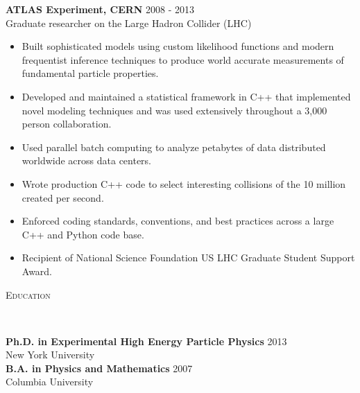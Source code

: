 \documentclass[9pt]{article}
\newenvironment{changemargin}[2]{%
  \begin{list}{}{%
    \setlength{\topsep}{0pt}%
    \setlength{\leftmargin}{#1}%
    \setlength{\rightmargin}{#2}%
    \setlength{\listparindent}{\parindent}%
    \setlength{\itemindent}{\parindent}%
    \setlength{\parsep}{\parskip}%
  }%
  \item[]}{\end{list}
}
\newcommand{\lineover}{
  \begin{changemargin}{-0.05in}{-0.05in}
    \vspace*{-8pt}
    \hrulefill \\
    \vspace*{-2pt}
  \end{changemargin}
}
\newcommand{\header}[1]{
  \begin{changemargin}{-0.5in}{-0.5in}
    \scshape{#1}
    \lineover
  \end{changemargin}
}
\newenvironment{body} {
  \vspace*{-16pt}
\begin{changemargin}{-0.25in}{-0.5in}
  }
{\end{changemargin}
}
\begin{document}
\begin{body}
        \medskip

        \textbf{ATLAS Experiment, CERN} \hfill 2008 - 2013\\
        Graduate researcher on the Large Hadron Collider (LHC) \\
        \medskip

        \begin{itemize}

        \item Built sophisticated models using custom likelihood functions and modern frequentist inference techniques to produce world accurate measurements of fundamental particle properties.

        \item Developed and maintained a statistical framework in C++ that implemented novel modeling techniques and was used extensively throughout a 3,000 person collaboration.

        \item Used parallel batch computing to analyze petabytes of data distributed worldwide across data centers.

        \item Wrote production C++ code to select interesting collisions of the 10 million created per second.

        \item Enforced coding standards, conventions, and best practices across a large C++ and Python code base.

        \item Recipient of National Science Foundation US LHC Graduate Student Support Award.

        \end{itemize}

\end{body}

\smallskip

\header{Education}

\begin{body}
  \vspace{14pt}
  \textbf{Ph.D. in Experimental High Energy Particle Physics }{} \hfill 2013{} \\
  New York University \\
  \medskip
  \textbf{B.A. in Physics and Mathematics} \hfill 2007 \\
  Columbia University\\
\end{body}
\end{document}
